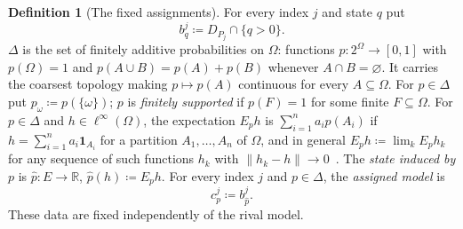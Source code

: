 \documentclass[11pt]{article}
\theoremstyle{definition}
\newtheorem{definition}[theorem]{Definition}
\newcommand{\R}{\mathbb R}
\newcommand{\one}{\mathbf 1}
\begin{document}
\begin{definition}[The fixed assignments]\label{def:assignments}
For every index $j$ and state $q$ put
\[
b^j_q\coloneqq D_{P_j}\cap\{q>0\}.
\]
{\color{red}$\Delta$ is the set of finitely additive probabilities on $\Omega$: functions $p:2^\Omega\to[0,1]$ with $p(\Omega)=1$ and $p(A\cup B)=p(A)+p(B)$ whenever $A\cap B=\varnothing$. It carries the coarsest topology making $p\mapsto p(A)$ continuous for every $A\subseteq\Omega$. For $p\in\Delta$ put $p_\omega\coloneqq p(\{\omega\})$; $p$ is \emph{finitely supported} if $p(F)=1$ for some finite $F\subseteq\Omega$. For $p\in\Delta$ and $h\in\ell^\infty(\Omega)$, the expectation $E_ph$ is $\sum_{i=1}^na_ip(A_i)$ if $h=\sum_{i=1}^na_i\one_{A_i}$ for a partition $A_1,\dots,A_n$ of $\Omega$, and in general $E_ph\coloneqq\lim_kE_ph_k$ for any sequence of such functions $h_k$ with $\|h_k-h\|\to0$~\cite{LDG}. The \emph{state induced by $p$} is $\hat p:E\to\R$, $\hat p(h)\coloneqq E_ph$. For every index $j$ and $p\in\Delta$, the \emph{assigned model} is
\[
c^j_p\coloneqq b^j_{\hat p}.
\]}
These data are fixed independently of the rival model.
\end{definition}
\end{document}
